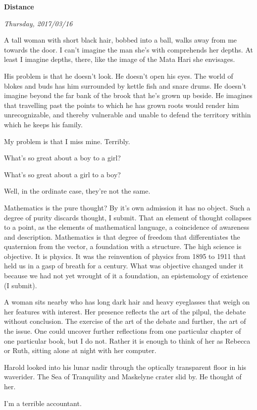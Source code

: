 

\centerline{\bf Distance}
\centerline{\it Thursday, 2017/03/16}



\break


A tall woman with short black hair, bobbed into a ball, walks away
from me towards the door.  I can't imagine the man she's with
comprehends her depths.  At least I imagine depths, there, like the
image of the Mata Hari she envisages.

His problem is that he doesn't look.  He doesn't open his eyes.  The
world of blokes and buds has him surrounded by kettle fish and snare
drums.  He doesn't imagine beyond the far bank of the brook that he's
grown up beside.  He imagines that travelling past the points to which
he has grown roots would render him unrecognizable, and thereby
vulnerable and unable to defend the territory within which he keeps
his family.

My problem is that I miss mine.  Terribly.


\break

What's so great about a boy to a girl?

What's so great about a girl to a boy?

Well, in the ordinate case, they're not the same.



\break


Mathematics is the pure thought?  By it's own admission it has no
object.  Such a degree of purity discards thought, I submit.  That an
element of thought collapses to a point, as the elements of
mathematical language, a coincidence of awareness and description.
Mathematics is that degree of freedom that differentiates the
quaternion from the vector, a foundation with a structure.  The high
science is objective.  It is physics.  It was the reinvention of
physics from 1895 to 1911 that held us in a gasp of breath for a
century.  What was objective changed under it because we had not yet
wrought of it a foundation, an epistemology of existence (I submit).


\break

A woman sits nearby who has long dark hair and heavy eyeglasses that
weigh on her features with interest.  Her presence reflects the art of
the pilpul, the debate without conclusion.  The exercise of the art of
the debate and further, the art of the issue.  One could uncover
further reflections from one particular chapter of one particular
book, but I do not.  Rather it is enough to think of her as Rebecca or
Ruth, sitting alone at night with her computer.


\break

Harold looked into his lunar nadir through the optically transparent
floor in his waverider.  The Sea of Tranquility and Maskelyne crater
slid by.  He thought of her.

\break

I'm a terrible accountant.




\bye
